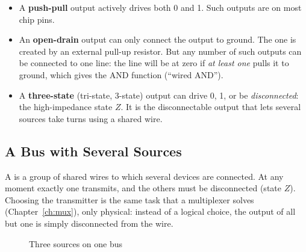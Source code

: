 \begin{itemize}
  \item A \textbf{push-pull} output actively drives both 0 and 1. Such
        outputs are on most chip pins.
  \item An \textbf{open-drain} output can only connect the output to
        ground. The one is created by an external pull-up resistor. But any number of such outputs
        can be connected to one line: the line will be at
        zero if \emph{at least one} pulls it to ground, which gives the
        AND function (``wired AND''). 
  \item A \textbf{three-state} (tri-state, 3-state) output can drive 0, 1,
        or be \emph{disconnected}: the high-impedance state $Z$. It is the
        disconnectable output that lets several sources take turns
        using a shared wire.
\end{itemize}

\subsection{A Bus with Several Sources}

A  is a group of shared wires to which several
devices are connected. At any moment exactly one transmits, and the others must be
disconnected (state $Z$). Choosing the transmitter is the same task that a
multiplexer solves (Chapter~\ref{ch:mux}), only physical: instead of a logical
choice, the output of all but one is simply disconnected from the wire.

\begin{figure}[H]
\centering
{}
\caption{Three sources on one bus}
\end{figure}


